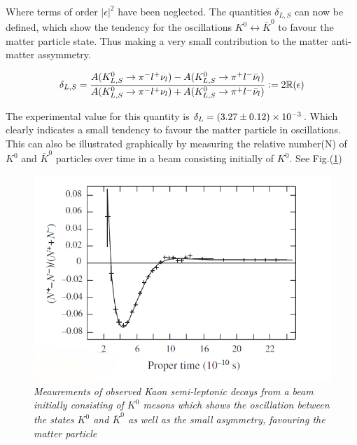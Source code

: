\noindent Where terms of order $|\epsilon|^{2}$ have been neglected. The quantities $\delta_{L,S}$ can now be defined, which show the tendency for the oscillations $K^{0} \leftrightarrow \bar{K}^{0}$ to favour the matter particle state. Thus making a very small contribution to the matter anti-matter assymmetry.

\begin{equation*}
\delta_{L,S} = \frac{A({K}^{0}_{L,S} \rightarrow \pi^{-} l^{+} \nu_{l}) - A({K}^{0}_{L,S} \rightarrow \pi^{+} l^{-} \bar{\nu}_{l})}{A({K}^{0}_{L,S} \rightarrow \pi^{-} l^{+} \nu_{l}) + A({K}^{0}_{L,S} \rightarrow \pi^{+} l^{-} \bar{\nu}_{l})} \vcentcolon= 2 \mathbb{R}(\epsilon)
\end{equation*}

\noindent The experimental value for this quantity is $\delta_{L} = (3.27 \pm 0.12) \times 10^{-3}$. Which clearly indicates a small tendency to favour the matter particle in oscillations. This can also be illustrated graphically by measuring the relative number(N) of $K^{0}$ and $\bar{K}^{0}$ particles over time in a beam consisting initially of $K^{0}$. See Fig.(\ref{AsymmetryPicFig})

\begin{figure}[h!]
\begin{center}
\includegraphics[scale=0.4]{figs/Asymmetry_pic}
\end{center}
\caption{\textit{Meaurements of observed Kaon semi-leptonic decays from a beam initially consisting of $K^{0}$ mesons which shows the oscillation between the states $K^{0}$ and $\bar{K}^{0}$ as well as the small asymmetry, favouring the matter particle \cite{AsymmetryPic}}}
\label{AsymmetryPicFig}
\end{figure}


